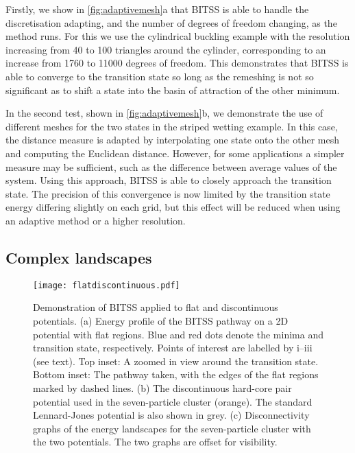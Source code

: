 \documentclass[aip,jcp,reprint,twocolumn]{revtex4-1}
\begin{document}
Firstly, we show in \cref{fig:adaptivemesh}a that BITSS is able to handle the discretisation adapting, and the number of degrees of freedom changing, as the method runs.
For this we use the cylindrical buckling example with the resolution increasing from 40 to 100 triangles around the cylinder, corresponding to an increase from \num{1760} to \num{11000} degrees of freedom.
This demonstrates that BITSS is able to converge to the transition state so long as the remeshing is not so significant as to shift a state into the basin of attraction of the other minimum.

In the second test, shown in \cref{fig:adaptivemesh}b, we demonstrate the use of different meshes for the two states in the striped wetting example.
In this case, the distance measure is adapted by interpolating one state onto the other mesh and computing the Euclidean distance.
However, for some applications a simpler measure may be sufficient, such as the difference between average values of the system.
Using this approach, BITSS is able to closely approach the transition state.
The precision of this convergence is now limited by the transition state energy differing slightly on each grid, but this effect will be reduced when using an adaptive method or a higher resolution.


\subsection{Complex landscapes}
\begin{figure}[tb]
  \texttt{[image: flatdiscontinuous.pdf]}
  \caption{\label{fig:flatdiscontinuous}
    Demonstration of BITSS applied to flat and discontinuous potentials.
    (a) Energy profile of the BITSS pathway on a 2D potential with flat regions.
        Blue and red dots denote the minima and transition state, respectively.
        Points of interest are labelled by i--iii (see text).
        Top inset: A zoomed in view around the transition state.
        Bottom inset: The pathway taken, with the edges of the flat regions marked by dashed lines.
    (b) The discontinuous hard-core pair potential used in the seven-particle cluster (orange).
        The standard Lennard-Jones potential is also shown in grey.
    (c) Disconnectivity graphs of the energy landscapes for the seven-particle cluster with the two potentials.
        The two graphs are offset for visibility.
  }
\end{figure}
\end{document}
